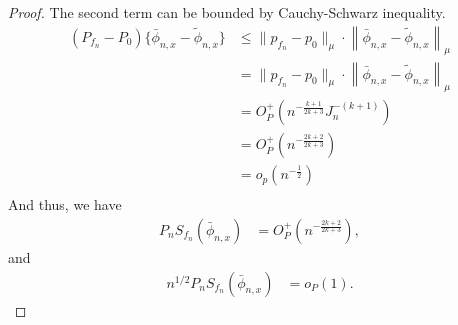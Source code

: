 \begin{proof}
The second term can be bounded by Cauchy-Schwarz inequality.
\begin{align*}
    (P_{f_n} - P_0) \{\bar{\phi}_{n,x}-\tilde{\phi}_{n,x}\} &\leq \|p_{f_n} - p_0\|_{\mu} \cdot \left\|\bar{\phi}_{n,x}-\tilde{\phi}_{n,x}\right\|_{\mu} \\
    &= \|p_{f_n} - p_0\|_{\mu} \cdot \left\|\bar{\phi}_{n,x}-\tilde{\phi}_{n,x}\right\|_{\mu} \\
    &= O_P^+(n^{-\frac{k+1}{2k+3}} J_n^{-(k+1)})  \\
    &= O_P^+(n^{-\frac{2k+2}{2k+3}}) \\
    &= o_p(n^{-\frac{1}{2}}) \\
\end{align*}
And thus, we have
\begin{align*}
    P_n S_{f_n}(\bar{\phi}_{n,x}) &= O_P^+(n^{-\frac{2k+2}{2k+3}}),
\end{align*}
and 
\begin{align*}
    n^{1/2}P_n S_{f_n}(\bar{\phi}_{n,x}) &= o_P(1).
\end{align*}
\end{proof}

